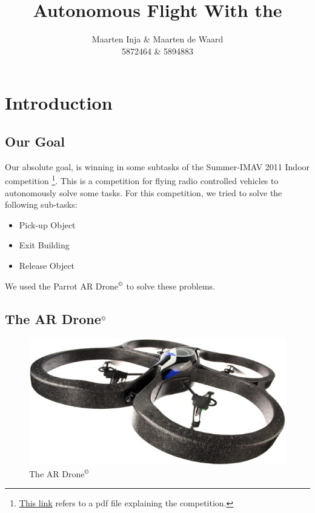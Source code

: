 \documentclass[a4paper,10pt]{article}
\title{Autonomous Flight With the \Ardrone}
\author{Maarten Inja \& Maarten de Waard\\\small 5872464 \& 5894883}
\newcommand{\Ardrone}{AR Drone$^{\copyright}$ }
\begin{document}
\maketitle
\tableofcontents

\section{Introduction}

\subsection{Our Goal}
Our absolute goal, is winning in some subtasks of the Summer-IMAV 2011 Indoor competition \footnote{\href{http://www.imav2011.org/images/stories/documents/summerimav2011\%20indoor\%20challenges\%20v2.0.pdf}{This link} refers to a pdf file explaining the competition.}.
This is a competition for flying radio controlled vehicles to autonomously solve some tasks. For this competition, we tried to solve the following sub-tasks:
\begin{itemize}
    \item Pick-up Object
    \item Exit Building
    \item Release Object
\end{itemize}
We used the Parrot \Ardrone to solve these problems.

\subsection{The \Ardrone}
\begin{figure}
  \centering
      \includegraphics[scale=0.5]{arDrone.jpg}
  \caption{The \Ardrone}
\end{figure}
\end{document}
